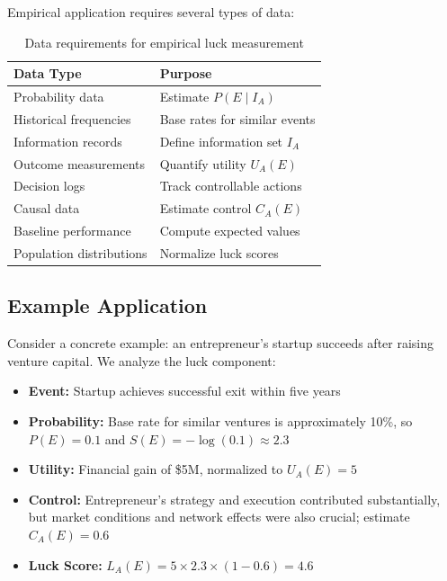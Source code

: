 Empirical application requires several types of data:

\begin{table}[H]
  \centering
  \begin{tabular}{ll}
    \toprule \textbf{Data Type} & \textbf{Purpose}               \\
    \midrule Probability data   & Estimate $P(E \mid I_{A})$     \\
    Historical frequencies      & Base rates for similar events  \\
    Information records         & Define information set $I_{A}$ \\
    Outcome measurements        & Quantify utility $U_{A}(E)$    \\
    Decision logs               & Track controllable actions     \\
    Causal data                 & Estimate control $C_{A}(E)$    \\
    Baseline performance        & Compute expected values        \\
    Population distributions    & Normalize luck scores          \\
    \bottomrule
  \end{tabular}
  \caption{Data requirements for empirical luck measurement}
  \label{tab:data}
\end{table}

\subsection{Example Application}

Consider a concrete example: an entrepreneur's startup succeeds after raising
venture capital. We analyze the luck component:

\begin{itemize}
  \item \textbf{Event:} Startup achieves successful exit within five
    years

  \item \textbf{Probability:} Base rate for similar ventures is
    approximately 10\%, so $P(E) = 0.1$ and
    $S(E) = -\log(0.1) \approx 2.3$

  \item \textbf{Utility:} Financial gain of \$5M, normalized to
    $U_{A}(E) = 5$

  \item \textbf{Control:} Entrepreneur's strategy and execution
    contributed substantially, but market conditions and network effects
    were also crucial; estimate $C_{A}(E) = 0.6$

  \item \textbf{Luck Score:}
    $L_{A}(E) = 5 \times 2.3 \times (1 - 0.6) = 4.6$
\end{itemize}

